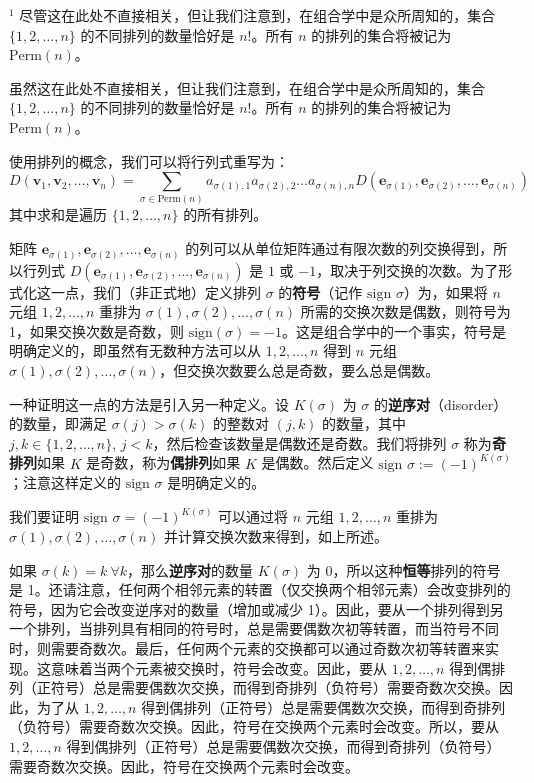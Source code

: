 $^1$ 尽管这在此处不直接相关，但让我们注意到，在组合学中是众所周知的，集合 $\{1, 2, \dots, n\}$ 的不同排列的数量恰好是 $n!$。所有 $n$ 的排列的集合将被记为 $\text{Perm}(n)$。

虽然这在此处不直接相关，但让我们注意到，在组合学中是众所周知的，集合 $\{1, 2, \dots, n\}$ 的不同排列的数量恰好是 $n!$。所有 $n$ 的排列的集合将被记为 $\text{Perm}(n)$。

使用排列的概念，我们可以将行列式重写为：
$$
D(\mathbf{v}_1, \mathbf{v}_2, \dots, \mathbf{v}_n) = \sum_{\sigma \in \text{Perm}(n)} a_{\sigma(1),1} a_{\sigma(2),2} \dots a_{\sigma(n),n} D(\mathbf{e}_{\sigma(1)}, \mathbf{e}_{\sigma(2)}, \dots, \mathbf{e}_{\sigma(n)})
$$
其中求和是遍历 $\{1, 2, \dots, n\}$ 的所有排列。

矩阵 $\mathbf{e}_{\sigma(1)}, \mathbf{e}_{\sigma(2)}, \dots, \mathbf{e}_{\sigma(n)}$ 的列可以从单位矩阵通过有限次数的列交换得到，所以行列式 $D(\mathbf{e}_{\sigma(1)}, \mathbf{e}_{\sigma(2)}, \dots, \mathbf{e}_{\sigma(n)})$ 是 $1$ 或 $-1$，取决于列交换的次数。为了形式化这一点，我们（非正式地）定义排列 $\sigma$ 的\textbf{符号}（记作 $\text{sign } \sigma$）为，如果将 $n$ 元组 $1, 2, \dots, n$ 重排为 $\sigma(1), \sigma(2), \dots, \sigma(n)$ 所需的交换次数是偶数，则符号为 1，如果交换次数是奇数，则 $\text{sign}(\sigma) = -1$。这是组合学中的一个事实，符号是明确定义的，即虽然有无数种方法可以从 $1, 2, \dots, n$ 得到 $n$ 元组 $\sigma(1), \sigma(2), \dots, \sigma(n)$，但交换次数要么总是奇数，要么总是偶数。

一种证明这一点的方法是引入另一种定义。设 $K(\sigma)$ 为 $\sigma$ 的\textbf{逆序对}（disorder）的数量，即满足 $\sigma(j) > \sigma(k)$ 的整数对 $(j, k)$ 的数量，其中 $j, k \in \{1, 2, \dots, n\}$, $j < k$，然后检查该数量是偶数还是奇数。我们将排列 $\sigma$ 称为\textbf{奇排列}如果 $K$ 是奇数，称为\textbf{偶排列}如果 $K$ 是偶数。然后定义 $\text{sign } \sigma := (-1)^{K(\sigma)}$；注意这样定义的 $\text{sign } \sigma$ 是明确定义的。

我们要证明 $\text{sign } \sigma = (-1)^{K(\sigma)}$ 可以通过将 $n$ 元组 $1, 2, \dots, n$ 重排为 $\sigma(1), \sigma(2), \dots, \sigma(n)$ 并计算交换次数来得到，如上所述。

如果 $\sigma(k) = k \ \forall k$，那么\textbf{逆序对}的数量 $K(\sigma)$ 为 0，所以这种\textbf{恒等}排列的符号是 1。还请注意，任何两个相邻元素的转置（仅交换两个相邻元素）会改变排列的符号，因为它会改变逆序对的数量（增加或减少 1）。因此，要从一个排列得到另一个排列，当排列具有相同的符号时，总是需要偶数次初等转置，而当符号不同时，则需要奇数次。最后，任何两个元素的交换都可以通过奇数次初等转置来实现。这意味着当两个元素被交换时，符号会改变。因此，要从 $1, 2, \dots, n$ 得到偶排列（正符号）总是需要偶数次交换，而得到奇排列（负符号）需要奇数次交换。因此，为了从 $1, 2, \dots, n$ 得到偶排列（正符号）总是需要偶数次交换，而得到奇排列（负符号）需要奇数次交换。因此，符号在交换两个元素时会改变。所以，要从 $1, 2, \dots, n$ 得到偶排列（正符号）总是需要偶数次交换，而得到奇排列（负符号）需要奇数次交换。因此，符号在交换两个元素时会改变。

